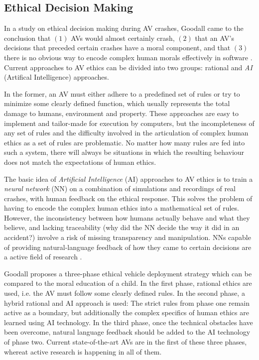\documentclass[11pt]{article}
\begin{document}
\subsection{Ethical Decision Making}
In a study on ethical decision making during AV crashes, Goodall came to the conclusion that $(1)$ AVs would almost certainly crash, $(2)$ that an AV's decisions that preceded certain crashes have a moral component, and that $(3)$ there is no obvious way to encode complex human morals effectively in software \cite{Goodall2014ethical}. Current approaches to AV ethics can be divided into two groups: rational and \textit{AI} (Artifical Intelligence) approaches. 

In the former, an AV must either adhere to a predefined set of rules or try to minimize some clearly defined function, which usually represents the total damage to humans, environment and property. These approaches are easy to implement and tailor-made for execution by computers, but the incompleteness of any set of rules and the difficulty involved in the articulation of complex human ethics as a set of rules are problematic. No matter how many rules are fed into such a system, there will always be situations in which the resulting behaviour does not match the expectations of human ethics.

The basic idea of \textit{Artificial Intelligence} (AI) approaches to AV ethics is to train a \textit{neural network} (NN) on a combination of simulations and recordings of real crashes, with human feedback on the ethical response. This solves the problem of having to encode the complex human ethics into a mathematical set of rules. However, the inconsistency between how humans actually behave and what they believe, and lacking traceability (why did the NN decide the way it did in an accident?) involve a risk of missing transparency and manipulation. NNs capable of providing natural-language feedback of how they came to certain decisions are a active field of research \cite[p. 63]{Goodall2014ethical}.

Goodall proposes a three-phase ethical vehicle deployment strategy \cite[p.63]{Goodall2014ethical} which can be compared to the moral education of a child. In the first phase, rational ethics are used, i.e. the AV must follow some clearly defined rules. In the second phase, a hybrid rational and AI approach is used: The strict rules from phase one remain active as a boundary, but additionally the complex specifics of human ethics are learned using AI technology. In the third phase, once the technical obstacles have been overcome, natural language feedback should be added to the AI technology of phase two. Current state-of-the-art AVs are in the first of these three phases, whereat active research is happening in all of them.
\end{document}
